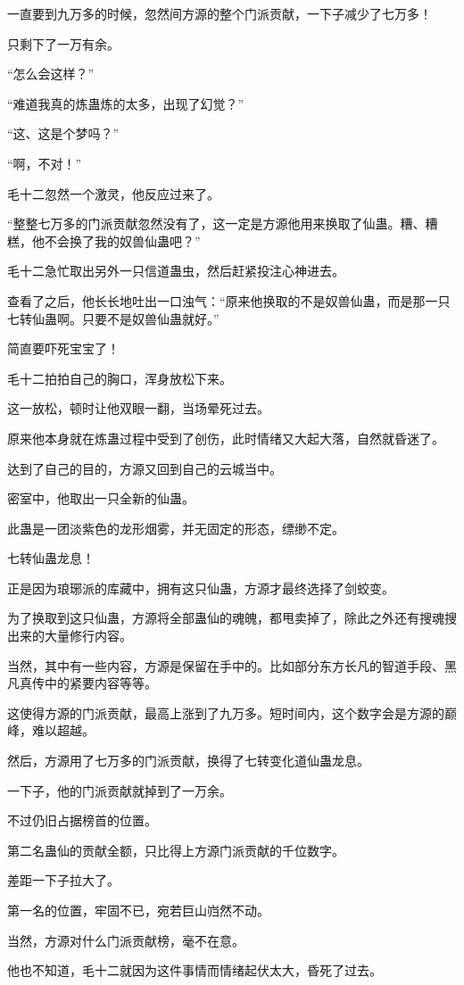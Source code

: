 \begin{this_body}
一直要到九万多的时候，忽然间方源的整个门派贡献，一下子减少了七万多！

只剩下了一万有余。

“怎么会这样？”

“难道我真的炼蛊炼的太多，出现了幻觉？”

“这、这是个梦吗？”

“啊，不对！”

毛十二忽然一个激灵，他反应过来了。

“整整七万多的门派贡献忽然没有了，这一定是方源他用来换取了仙蛊。糟、糟糕，他不会换了我的奴兽仙蛊吧？”

毛十二急忙取出另外一只信道蛊虫，然后赶紧投注心神进去。

查看了之后，他长长地吐出一口浊气：“原来他换取的不是奴兽仙蛊，而是那一只七转仙蛊啊。只要不是奴兽仙蛊就好。”

简直要吓死宝宝了！

毛十二拍拍自己的胸口，浑身放松下来。

这一放松，顿时让他双眼一翻，当场晕死过去。

原来他本身就在炼蛊过程中受到了创伤，此时情绪又大起大落，自然就昏迷了。

达到了自己的目的，方源又回到自己的云城当中。

密室中，他取出一只全新的仙蛊。

此蛊是一团淡紫色的龙形烟雾，并无固定的形态，缥缈不定。

七转仙蛊龙息！

正是因为琅琊派的库藏中，拥有这只仙蛊，方源才最终选择了剑蛟变。

为了换取到这只仙蛊，方源将全部蛊仙的魂魄，都甩卖掉了，除此之外还有搜魂搜出来的大量修行内容。

当然，其中有一些内容，方源是保留在手中的。比如部分东方长凡的智道手段、黑凡真传中的紧要内容等等。

这使得方源的门派贡献，最高上涨到了九万多。短时间内，这个数字会是方源的巅峰，难以超越。

然后，方源用了七万多的门派贡献，换得了七转变化道仙蛊龙息。

一下子，他的门派贡献就掉到了一万余。

不过仍旧占据榜首的位置。

第二名蛊仙的贡献全额，只比得上方源门派贡献的千位数字。

差距一下子拉大了。

第一名的位置，牢固不已，宛若巨山岿然不动。

当然，方源对什么门派贡献榜，毫不在意。

他也不知道，毛十二就因为这件事情而情绪起伏太大，昏死了过去。


\end{this_body}

